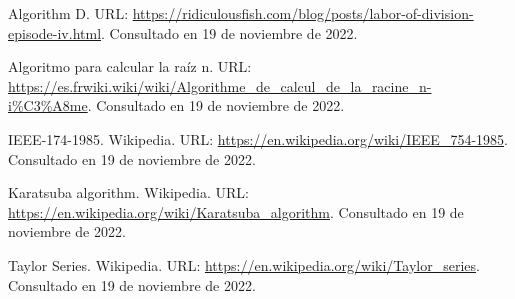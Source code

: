 \documentclass[a4paper,10pt,twocolumn]{article}
\begin{document}
\begin{thebibliography}{99}
	 Algorithm D. URL: \href{https://ridiculousfish.com/blog/posts/labor-of-division-episode-iv.html}
	  {https://ridiculousfish.com/blog/posts/labor-of-division-episode-iv.html}.
		Consultado en 19 de noviembre de 2022.
		
	 Algoritmo para calcular la raíz n. URL: \href{https://es.frwiki.wiki/wiki/Algorithme_de_calcul_de_la_racine_n-i\%C3\%A8me}
	  {https://es.frwiki.wiki/wiki/Algorithme\_de\_calcul\_de\_la\_racine\_n-i\%C3\%A8me}.
		Consultado en 19 de noviembre de 2022.
	
	 IEEE-174-1985. Wikipedia. URL: \href{https://en.wikipedia.org/wiki/IEEE_754-1985}
	  {https://en.wikipedia.org/wiki/IEEE\_754-1985}.
		Consultado en 19 de noviembre de 2022.
		
	 Karatsuba algorithm. Wikipedia. URL: \href{https://en.wikipedia.org/wiki/Karatsuba_algorithm}
	  {https://en.wikipedia.org/wiki/Karatsuba\_algorithm}.
		Consultado en 19 de noviembre de 2022.	
		
	 Taylor Series. Wikipedia. URL: \href{https://en.wikipedia.org/wiki/Taylor_series}
	  {https://en.wikipedia.org/wiki/Taylor\_series}.
		Consultado en 19 de noviembre de 2022.
		
	
	
	
	

\end{thebibliography}


\label{end}
\end{document}

